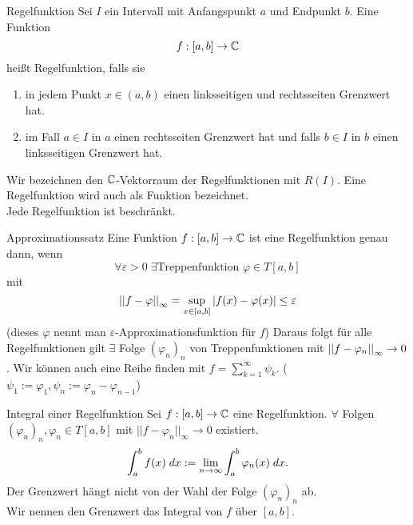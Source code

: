 \documentclass[main.tex]{subfiles}
\begin{document}
\begin{karte}{Regelfunktion}
    Sei \( I \) ein Intervall mit Anfangspunkt \(a\) 
    und Endpunkt \(b\). Eine Funktion 
    \[ \abb{f}{[a,b]}{\C} \] 
    heißt Regelfunktion, falls sie 
    \begin{enumerate}
        \item in jedem Punkt \(x \in (a,b)\) 
        einen linksseitigen und rechtsseiten 
        Grenzwert hat.
        
        \item im Fall \( a \in I \) in \(a\) einen 
        rechtsseiten Grenzwert hat und falls 
        \( b \in I \) in \(b\) 
        einen linksseitigen Grenzwert hat.
    \end{enumerate}
    Wir bezeichnen den \( \C \)-Vektorraum der 
    Regelfunktionen mit \( R(I) \).
    Eine Regelfunktion wird auch als  Funktion bezeichnet.\\
    Jede Regelfunktion ist beschränkt.
\end{karte}

\begin{karte}{Approximationssatz}
    Eine Funktion \( \abb{f}{[a,b]}{\C} \) ist 
    eine Regelfunktion genau dann, wenn 
    \[ \forall \varepsilon > 0 \; \exists 
    \text{Treppenfunktion } \varphi \in T[a,b] \]
    mit 
    \[ \norm{f - \varphi}_\infty 
    = \underset{x \in [a,b]}{\sup} \abs{f(x) - \varphi(x)}
    \leq \varepsilon \]
    (dieses \(\varphi\) nennt man \( \varepsilon \)-Approximationsfunktion
    für \(f\))
    Daraus folgt für alle Regelfunktionen gilt 
    \( \exists \) Folge \( (\varphi_n)_n \) von Treppenfunktionen 
    mit \( \norm{f - \varphi_n}_\infty \rightarrow 0 \). 
    Wir können auch eine Reihe finden mit \( f = \sum_{k=1}^\infty \psi_k \). 
    (\( \psi_1 := \varphi_1, \psi_n := \varphi_n - \varphi_{n-1} \))
\end{karte}

\begin{karte}{Integral einer Regelfunktion}
    Sei \( \abb{f}{[a,b]}{\C} \) eine Regelfunktion.
    \( \forall \) Folgen \( (\varphi_n)_n, \varphi_n \in T[a,b] \)
    mit \( ||f - \varphi_n||_\infty \rightarrow 0 \) existiert.
    \[ \integral{f(x)}{a}{b} 
    := \limes{n} \integral{\varphi_n(x)}{a}{b}. \]
    Der Grenzwert hängt nicht von der Wahl der Folge
    \( (\varphi_n)_n \) ab.\\
    Wir nennen den Grenzwert das Integral von 
    \( f \) über \( [a,b] \).
\end{karte}
\end{document}
